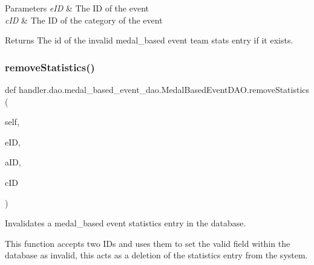 \begin{DoxyParams}{Parameters}
{\em e\+ID} & The ID of the event \\
\hline
{\em c\+ID} & The ID of the category of the event\\
\hline
\end{DoxyParams}
\begin{DoxyReturn}{Returns}
The id of the invalid medal\+\_\+based event team stats entry if it exists. 
\end{DoxyReturn}
\mbox{\label{classhandler_1_1dao_1_1medal__based__event__dao_1_1_medal_based_event_d_a_o_a9497c2bcc968769afdfad9e36a4a6186}} 
\subsubsection{\texorpdfstring{remove\+Statistics()}{removeStatistics()}}
{\footnotesize\ttfamily def handler.\+dao.\+medal\+\_\+based\+\_\+event\+\_\+dao.\+Medal\+Based\+Event\+D\+A\+O.\+remove\+Statistics (\begin{DoxyParamCaption}\item[{}]{self,  }\item[{}]{e\+ID,  }\item[{}]{a\+ID,  }\item[{}]{c\+ID }\end{DoxyParamCaption})}



Invalidates a medal\+\_\+based event statistics entry in the database. 

This function accepts two I\+Ds and uses them to set the valid field within the database as invalid, this acts as a deletion of the statistics entry from the system.


